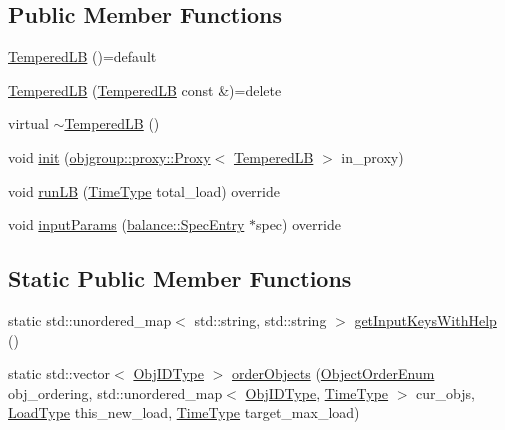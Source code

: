 \subsection*{Public Member Functions}
\begin{DoxyCompactItemize}
\item 
\hyperlink{structvt_1_1vrt_1_1collection_1_1lb_1_1_tempered_l_b_aa891f50b88bc2c43675205fe42f1a1bc}{Tempered\+LB} ()=default
\item 
\hyperlink{structvt_1_1vrt_1_1collection_1_1lb_1_1_tempered_l_b_a95a26dba017d5d4abbdd2e93cb3c32bd}{Tempered\+LB} (\hyperlink{structvt_1_1vrt_1_1collection_1_1lb_1_1_tempered_l_b}{Tempered\+LB} const \&)=delete
\item 
virtual \hyperlink{structvt_1_1vrt_1_1collection_1_1lb_1_1_tempered_l_b_ad8138112521d369244bd38a327c41832}{$\sim$\+Tempered\+LB} ()
\item 
void \hyperlink{structvt_1_1vrt_1_1collection_1_1lb_1_1_tempered_l_b_a57685d91f6518f5e479aba83f779d0f5}{init} (\hyperlink{structvt_1_1objgroup_1_1proxy_1_1_proxy}{objgroup\+::proxy\+::\+Proxy}$<$ \hyperlink{structvt_1_1vrt_1_1collection_1_1lb_1_1_tempered_l_b}{Tempered\+LB} $>$ in\+\_\+proxy)
\item 
void \hyperlink{structvt_1_1vrt_1_1collection_1_1lb_1_1_tempered_l_b_a18efa54b58d642d8bb1cd373514e814f}{run\+LB} (\hyperlink{namespacevt_a876a9d0cd5a952859c72de8a46881442}{Time\+Type} total\+\_\+load) override
\item 
void \hyperlink{structvt_1_1vrt_1_1collection_1_1lb_1_1_tempered_l_b_a12430d0bfd997324ac4343d736d0572e}{input\+Params} (\hyperlink{structvt_1_1vrt_1_1collection_1_1balance_1_1_spec_entry}{balance\+::\+Spec\+Entry} $\ast$spec) override
\end{DoxyCompactItemize}
\subsection*{Static Public Member Functions}
\begin{DoxyCompactItemize}
\item 
static std\+::unordered\+\_\+map$<$ std\+::string, std\+::string $>$ \hyperlink{structvt_1_1vrt_1_1collection_1_1lb_1_1_tempered_l_b_a37e3599168c2a90967bd7dc7128c54f0}{get\+Input\+Keys\+With\+Help} ()
\item 
static std\+::vector$<$ \hyperlink{structvt_1_1vrt_1_1collection_1_1lb_1_1_base_l_b_a790b22acf448880599724749cdc4e9b3}{Obj\+I\+D\+Type} $>$ \hyperlink{structvt_1_1vrt_1_1collection_1_1lb_1_1_tempered_l_b_a3cb11a0007b4402dc803a9d2d9d23cd9}{order\+Objects} (\hyperlink{namespacevt_1_1vrt_1_1collection_1_1lb_a3c71e131f84e2ccbb95f43a1058c749c}{Object\+Order\+Enum} obj\+\_\+ordering, std\+::unordered\+\_\+map$<$ \hyperlink{structvt_1_1vrt_1_1collection_1_1lb_1_1_base_l_b_a790b22acf448880599724749cdc4e9b3}{Obj\+I\+D\+Type}, \hyperlink{namespacevt_a876a9d0cd5a952859c72de8a46881442}{Time\+Type} $>$ cur\+\_\+objs, \hyperlink{structvt_1_1vrt_1_1collection_1_1lb_1_1_base_l_b_a215e22b9f12678303f49615ae3be05cc}{Load\+Type} this\+\_\+new\+\_\+load, \hyperlink{namespacevt_a876a9d0cd5a952859c72de8a46881442}{Time\+Type} target\+\_\+max\+\_\+load)
\end{DoxyCompactItemize}
